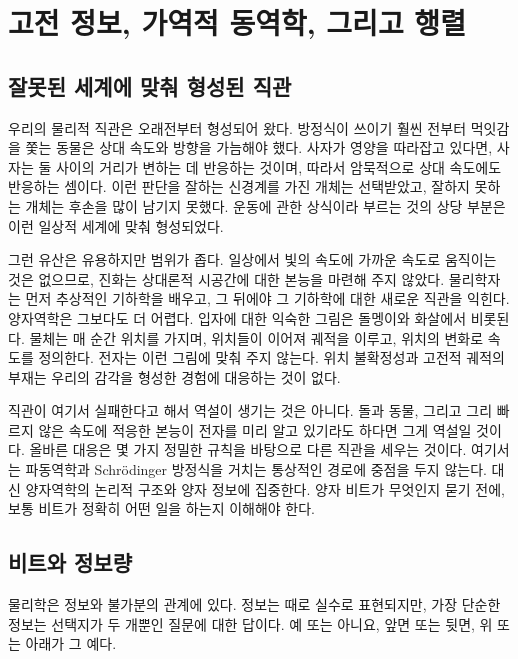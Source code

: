 \chapter{고전 정보, 가역적 동역학, 그리고 행렬}


\section{잘못된 세계에 맞춰 형성된 직관}

우리의 물리적 직관은 오래전부터 형성되어 왔다. 방정식이 쓰이기 훨씬 전부터 먹잇감을 쫓는 동물은 상대 속도와 방향을 가늠해야 했다. 사자가 영양을 따라잡고 있다면, 사자는 둘 사이의 거리가 변하는 데 반응하는 것이며, 따라서 암묵적으로 상대 속도에도 반응하는 셈이다. 이런 판단을 잘하는 신경계를 가진 개체는 선택받았고, 잘하지 못하는 개체는 후손을 많이 남기지 못했다. 운동에 관한 상식이라 부르는 것의 상당 부분은 이런 일상적 세계에 맞춰 형성되었다.

그런 유산은 유용하지만 범위가 좁다. 일상에서 빛의 속도에 가까운 속도로 움직이는 것은 없으므로, 진화는 상대론적 시공간에 대한 본능을 마련해 주지 않았다. 물리학자는 먼저 추상적인 기하학을 배우고, 그 뒤에야 그 기하학에 대한 새로운 직관을 익힌다. 양자역학은 그보다도 더 어렵다. 입자에 대한 익숙한 그림은 돌멩이와 화살에서 비롯된다. 물체는 매 순간 위치를 가지며, 위치들이 이어져 궤적을 이루고, 위치의 변화로 속도를 정의한다. 전자는 이런 그림에 맞춰 주지 않는다. 위치 불확정성과 고전적 궤적의 부재는 우리의 감각을 형성한 경험에 대응하는 것이 없다.

직관이 여기서 실패한다고 해서 역설이 생기는 것은 아니다. 돌과 동물, 그리고 그리 빠르지 않은 속도에 적응한 본능이 전자를 미리 알고 있기라도 하다면 그게 역설일 것이다. 올바른 대응은 몇 가지 정밀한 규칙을 바탕으로 다른 직관을 세우는 것이다. 여기서는 파동역학과 Schr\"odinger 방정식을 거치는 통상적인 경로에 중점을 두지 않는다. 대신 양자역학의 논리적 구조와 양자 정보에 집중한다. 양자 비트가 무엇인지 묻기 전에, 보통 비트가 정확히 어떤 일을 하는지 이해해야 한다.

\section{비트와 정보량}

물리학은 정보와 불가분의 관계에 있다. 정보는 때로 실수로 표현되지만, 가장 단순한 정보는 선택지가 두 개뿐인 질문에 대한 답이다. 예 또는 아니요, 앞면 또는 뒷면, 위 또는 아래가 그 예다.

